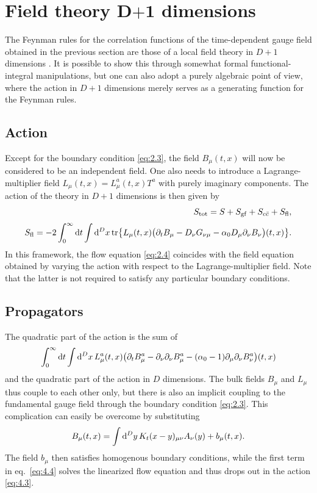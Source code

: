 \section{Field theory $\boldsymbol{D}\mathbf{+1}$ dimensions}\label{sec:fieldtheory}

The Feynman rules for the correlation functions of the time-dependent
gauge field obtained in the previous section
are those of a local field theory in $D+1$ dimensions \cite{ZinnZwanziger}.
It is possible to show this through somewhat formal
functional-integral mani\-pulations, but one can also adopt
a purely algebraic point of view, where the action in $D+1$ dimensions
merely serves as a generating function for the Feynman rules.

\subsection{Action}

Except for the boundary condition \eqref{eq:2.3},
the field $B_{\mu}(t,x)$ will now be considered to be an
independent field.
One also needs to introduce a Lagrange-multiplier
field $L_{\mu}(t,x)=L_{\mu}^a(t,x)T^a$
with purely imaginary components.
The action of the theory in $D+1$ dimensions is then given by
\cite{ZinnZwanziger}
\begin{align}
   S_{\mathrm{tot}}=S+S_{\mathrm{gf}}+S_{c\bar{c}}+S_{\mathrm{fl}},
   \label{eq:4.1}\\[2.5pt]
   S_{\mathrm{fl}}=-2\int_0^{\infty}\mathrm{d} t\int\mathrm{d}^Dx\,
   \mathrm{tr}\bigl\{L_{\mu}(t,x)
   \bigl(\partial_tB_{\mu}-
         D_{\nu}G_{\nu\mu}-\alpha_0D_{\mu}\partial_{\nu}B_{\nu}
   \bigr)(t,x)\bigr\}.
   \label{eq:4.2}
\end{align}
In this framework, the flow equation \eqref{eq:2.4} coincides with
the field equation obtained by varying the action with respect to the
Lagrange-multiplier field. Note that the latter is not required to
satisfy any particular boundary conditions.

\subsection{Propagators}\label{ssec:propagators4}

The quadratic part of the action is the sum of
\begin{equation}
   \int_0^{\infty}\mathrm{d} t\int\mathrm{d}^Dx\, L^a_{\mu}(t,x)
   \bigl(
   \partial_tB^a_{\mu}-\partial_{\nu}\partial_{\nu}B^a_{\mu}
   -(\alpha_0-1)\partial_{\mu}\partial_{\nu}B^a_{\nu}
   \bigr)(t,x)
   \label{eq:4.3}
\end{equation}
and the quadratic part of the action in $D$ dimensions.
The bulk fields $B_{\mu}$ and $L_{\mu}$
thus couple to each other only, but there is also
an implicit coupling to the fundamental gauge field
through the boundary condition \eqref{eq:2.3}.
This complication can easily be overcome by substituting
\begin{equation}
   B_{\mu}(t,x)=\int\mathrm{d}^Dy\,K_t(x-y)_{\mu\nu}A_{\nu}(y)+b_{\mu}(t,x).
   \label{eq:4.4}
\end{equation}
The field $b_{\mu}$ then satisfies homogenous boundary conditions,
while the first term in eq.~\eqref{eq:4.4} solves the linearized flow equation
and thus drops out in the action \eqref{eq:4.3}.

